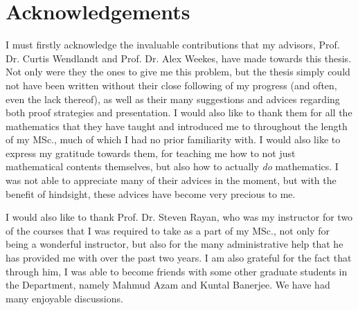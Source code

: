 \section*{Acknowledgements}
    I must firstly acknowledge the invaluable contributions that my advisors, Prof. Dr. Curtis Wendlandt and Prof. Dr. Alex Weekes, have made towards this thesis. Not only were they the ones to give me this problem, but the thesis simply could not have been written without their close following of my progress (and often, even the lack thereof), as well as their many suggestions and advices regarding both proof strategies and presentation. I would also like to thank them for all the mathematics that they have taught and introduced me to throughout the length of my MSc., much of which I had no prior familiarity with. I would also like to express my gratitude towards them, for teaching me how to not just mathematical contents themselves, but also how to actually \textit{do} mathematics. I was not able to appreciate many of their advices in the moment, but with the benefit of hindsight, these advices have become very precious to me.
    
    I would also like to thank Prof. Dr. Steven Rayan, who was my instructor for two of the courses that I was required to take as a part of my MSc., not only for being a wonderful instructor, but also for the many administrative help that he has provided me with over the past two years. I am also grateful for the fact that through him, I was able to become friends with some other graduate students in the Department, namely Mahmud Azam and Kuntal Banerjee. We have had many enjoyable discussions.